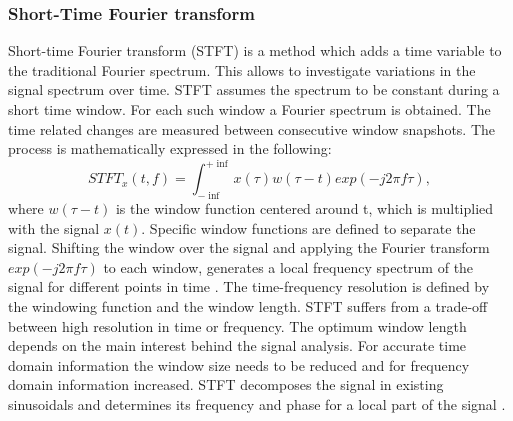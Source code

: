 \subsubsection{Short-Time Fourier transform}
Short-time Fourier transform (STFT) is a method which adds a time variable to the traditional Fourier spectrum. This allows to investigate variations in the signal spectrum over time. STFT assumes the spectrum to be constant during a short time window. For each such window a Fourier spectrum is obtained. The time related changes are measured between consecutive window snapshots. The process is mathematically expressed in the following:  
\begin{equation}
    STFT_{x}(t,f) = \int_{- \inf}^{+ \inf}x(\tau) w(\tau -t) exp(-j2\pi f \tau),
\end{equation}
where  $w(\tau -t)$ is the window function centered around t, which is multiplied with the signal $x(t)$. Specific window functions are defined to separate the signal. Shifting the window over the signal and applying the Fourier transform $exp(-j2\pi f \tau)$ to each window, generates a local frequency spectrum of the signal for different points in time \cite{FENG2013}. The time-frequency resolution is defined by the windowing function and the window length. STFT suffers from a trade-off between high resolution in time or frequency. The optimum window length depends on the main interest behind the signal analysis. For accurate time domain information the window size needs to be reduced and for frequency domain information increased. STFT  decomposes the signal in existing sinusoidals and determines its frequency and phase for a local part of the signal \cite{Hlawatsch1992}. 

